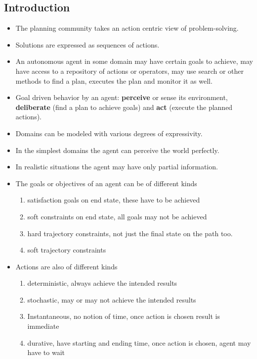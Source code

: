 \documentclass[a4paper]{article}
\begin{document}
\subsection{Introduction}
\begin{itemize}
    \item The planning community takes an action centric view of problem-solving.
    \item Solutions are expressed as sequences of actions.
    \item An autonomous agent in some domain may have certain goals to achieve, may have access to a repository of actions or operators, may use search or other methods to find a plan, executes the plan and monitor it as well.
    \item Goal driven behavior by an agent: \textbf{perceive} or sense its environment, \textbf{deliberate} (find a plan to achieve goals) and \textbf{act} (execute the planned actions).
    \item Domains can be modeled with various degrees of expressivity.
    \item In the simplest domains the agent can perceive the world perfectly.
    \item In realistic situations the agent may have only partial information.
    \item The goals or objectives of an agent can be of different kinds
    \begin{enumerate}
        \item satisfaction goals on end state, these have to be achieved
        \item soft constraints on end state, all goals may not be achieved
        \item hard trajectory constraints, not just the final state on the path too.
        \item soft trajectory constraints
    \end{enumerate}
    \item Actions are also of different kinds
    \begin{enumerate}
        \item deterministic, always achieve the intended results
        \item stochastic, may or may not achieve the intended results
        \item Instantaneous, no notion of time, once action is chosen result is immediate
        \item durative, have starting and ending time, once action is chosen, agent may have to wait

\end{enumerate}
\end{itemize}
\end{document}

